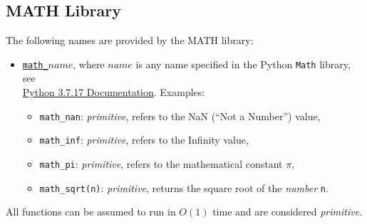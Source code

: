 \subsection*{MATH Library}


The following names are provided by the MATH library:
\begin{itemize}
\item \href{https://sourceacademy.org/sicpjs/1.1.4\#p8}{\lstinline{math_}$\textit{name}$},
where $\textit{name}$ is any name specified in the
Python
\texttt{Math} library, see\\
\href{https://docs.python.org/3.7/library/math.html}{\color{DarkBlue}Python 3.7.17 Documentation}. Examples:
\begin{itemize}
\item \verb#math_nan#: \textit{primitive}, refers to the NaN (``Not a Number'') value,
\item \verb#math_inf#: \textit{primitive}, refers to the Infinity value,
\item \verb#math_pi#: \textit{primitive}, refers to the mathematical constant $\pi$,
\item \verb#math_sqrt#\texttt{(n)}: \textit{primitive}, returns the square root of the \emph{number} \texttt{n}.
\end{itemize}
\end{itemize}
All functions can be assumed to run in $O(1)$ time and are considered
\textit{primitive}.
